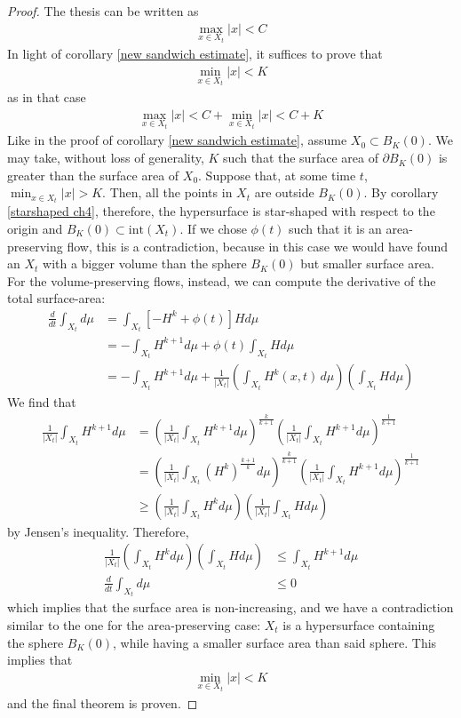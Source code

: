 \begin{proof}
	The thesis can be written as 
	\begin{align*}
		\max_{x\in X_t} |x| < C
	\end{align*}
	In light of corollary \ref{new sandwich estimate}, it suffices to prove that 
	\begin{align*}
		\min_{x\in X_t} |x| < K
	\end{align*}
	as in that case 
	\begin{align*}
		\max_{x\in X_t} |x| < C + \min_{x\in X_t} |x| < C+K
	\end{align*}
	Like in the proof of corollary \ref{new sandwich estimate}, assume $X_0\subset B_K(0)$. We may take, without loss of generality, $K$ such that the surface area of $\partial B_K(0)$ is greater than the surface area of $X_0$. 
	Suppose that, at some time $t$, $\min_{x\in X_t} |x| > K$. Then, all the points in $X_t$ are outside $B_K(0)$.  By corollary \ref{starshaped ch4}, therefore, the hypersurface is star-shaped with respect to the origin and $B_K(0)\subset \mathrm{int}(X_t)$. If we chose $\phi(t)$ such that it is an area-preserving flow, this is a contradiction, because in this case we would have found an $X_t$ with a bigger volume than the sphere $B_K(0)$ but smaller surface area. For the volume-preserving flows, instead, we can compute the derivative of the total surface-area: 
	\begin{align*}
		\frac{d}{d t}\int_{X_t} d\mu &=  \int_{X_t}  \left[- H^k + \phi(t)\right] H d\mu \\
		&= - \int_{X_t}  H^{k+1} d\mu  + \phi(t)\int_{X_t} H d\mu\\
		&= - \int_{X_t}  H^{k+1} d\mu  + \frac{1}{|X_t|}\left(\int_{X_t} H^k(x, t) \, d\mu\right)\left(\int_{X_t} H d\mu\right)
	\end{align*}
	We find that 
	\begin{align*}
		\frac{1}{|X_t|}\int_{X_t}  H^{k+1} d\mu &=\left(\frac{1}{|X_t|}\int_{X_t}  H^{k+1} d\mu\right)^{\frac{k}{k+1}}\left(\frac{1}{|X_t|}\int_{X_t}  H^{k+1} d\mu\right)^{\frac{1}{k+1}}\\ &=\left(\frac{1}{|X_t|}\int_{X_t}  \left(H^{k}\right)^{\frac{k+1}{k}} d\mu\right)^{\frac{k}{k+1}}  \left(\frac{1}{|X_t|}\int_{X_t}  H^{k+1} d\mu\right)^{\frac{1}{k+1}}\\
		&\geq \left(\frac{1}{|X_t|}\int_{X_t}  H^{k} d\mu\right) \left(\frac{1}{|X_t|}\int_{X_t}  H d\mu\right)
	\end{align*}
	by Jensen's inequality. Therefore, 
	\begin{align*}
		\frac{1}{|X_t|} \left(\int_{X_t}  H^{k} d\mu\right) \left(\int_{X_t}  H d\mu\right)&\leq \int_{X_t}  H^{k+1} d\mu\\
		\frac{d}{d t}\int_{X_t} d\mu &\leq 0
	\end{align*}
	which implies that the surface area is non-increasing, and we have a contradiction similar to the one for the area-preserving case: $X_t$ is a hypersurface containing the sphere $B_K(0)$, while having a smaller surface area than said sphere. This implies that 
	\begin{align*}
		\min_{x\in X_t} |x| < K
	\end{align*}
	and the final theorem is proven. 
\end{proof}
